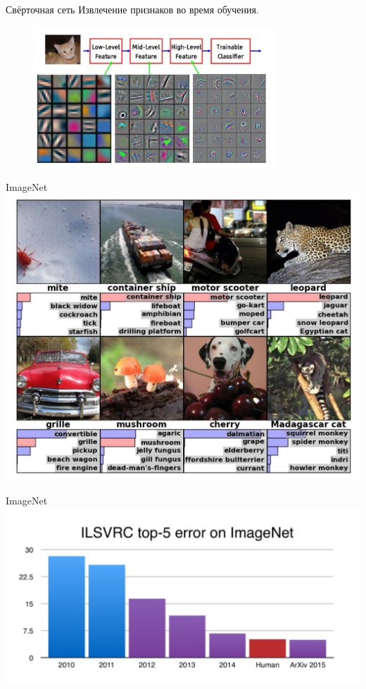 \documentclass[10pt]{beamer}
\begin{document}
{
\begin{frame}{Свёрточная сеть}
  Извлечение признаков во время обучения.\\

	\begin{figure}[htbp]
	  \includegraphics[height=150pt, keepaspectratio = true]{images/deep_learning}   
	\end{figure}
\end{frame}
}

{
\begin{frame}{ImageNet}
  \centering
  \includegraphics[width=0.9 \textwidth, keepaspectratio = true]{images/imagenet}   
\end{frame}
}

\begin{frame}{ImageNet}
  \centering
  \includegraphics[width=0.9 \textwidth, keepaspectratio = true]{images/top5}   
\end{frame}
\end{document}
